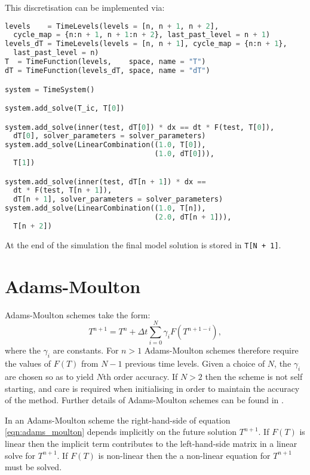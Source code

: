 \documentclass[a4paper]{book}
\begin{document}
This discretisation can be implemented via:
\begin{lstlisting}[language = python, frame = single, basicstyle=\footnotesize]
levels    = TimeLevels(levels = [n, n + 1, n + 2],
  cycle_map = {n:n + 1, n + 1:n + 2}, last_past_level = n + 1)
levels_dT = TimeLevels(levels = [n, n + 1], cycle_map = {n:n + 1},
  last_past_level = n)
T  = TimeFunction(levels,    space, name = "T")
dT = TimeFunction(levels_dT, space, name = "dT")

system = TimeSystem()

system.add_solve(T_ic, T[0])

system.add_solve(inner(test, dT[0]) * dx == dt * F(test, T[0]),
  dT[0], solver_parameters = solver_parameters)
system.add_solve(LinearCombination((1.0, T[0]),
                                   (1.0, dT[0])),
  T[1])

system.add_solve(inner(test, dT[n + 1]) * dx ==
  dt * F(test, T[n + 1]),
  dT[n + 1], solver_parameters = solver_parameters)
system.add_solve(LinearCombination((1.0, T[n]),
                                   (2.0, dT[n + 1])),
  T[n + 2])
\end{lstlisting}
At the end of the simulation the final model solution is stored in
\verb=T[N + 1]=.

\section{Adams-Moulton}

Adams-Moulton schemes take the form:
\begin{equation}\label{eqn:adams_moulton}
  T^{n + 1} = T^n + \Delta t \sum_{i = 0}^N \gamma_i F( T^{n + 1 - i}),
\end{equation}
where the $\gamma_i$ are constants. For $n > 1$ Adams-Moulton schemes therefore
require the values of $F(T)$ from $N - 1$ previous time levels. Given a choice
of $N$, the $\gamma_i$ are chosen so as to yield $N$th order accuracy. If
$N > 2$ then the scheme is not self starting, and care is required when
initialising in order to maintain the accuracy of the method. Further details of
Adams-Moulton schemes can be found in \citet[section III.1]{hairer1987}.

In an Adams-Moulton scheme the right-hand-side of equation
\eqref{eqn:adams_moulton} depends implicitly on the future solution $T^{n + 1}$.
If $F(T)$ is linear then the implicit term contributes to the left-hand-side
matrix in a linear solve for $T^{n + 1}$. If $F(T)$ is non-linear then the
a non-linear equation for $T^{n + 1}$ must be solved.
\end{document}

